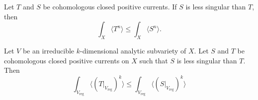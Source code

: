 \documentclass[10pt,a4paper]{amsart}
\newcommand{\reg}{{\operatorname{reg}}}
\begin{document}
\begin{theorem}\label{thm:monotone}
   Let $T$ and $S$ be cohomologous closed positive currents. If $S$ is less singular than $T$, then
\begin{equation*}
   \int_X \langle T^n\rangle \le \int_X \langle S^n\rangle. 
\end{equation*}
\end{theorem}

\begin{prop}\label{prop: r monotone}
    Let $V$ be an irreducible $k$-dimensional analytic subvariety of $X$. Let $S$ and $T$ be cohomologous closed positive currents on $X$ such that $S$ is less singular than $T$. Then 
    \[\int_{V_\reg} \langle(T|_{V_\reg})^k\rangle \le \int_{V_\reg} \langle(S|_{V_\reg})^k\rangle\]
\end{prop}
\end{document}
